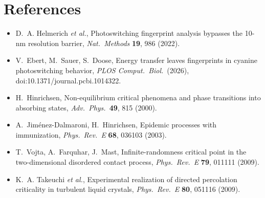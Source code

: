 \documentclass[11pt,a4paper]{article}
\begin{document}
\section*{References}
\begin{itemize}\small
  \item D.~A. Helmerich \emph{et al.}, Photoswitching fingerprint analysis
  bypasses the 10-nm resolution barrier, \emph{Nat.\ Methods} \textbf{19},
  986 (2022).
  \item V.~Ebert, M.~Sauer, S.~Doose, Energy transfer leaves fingerprints in
  cyanine photoswitching behavior, \emph{PLOS Comput.\ Biol.}\ (2026),
  doi:10.1371/journal.pcbi.1014322.
  \item H.~Hinrichsen, Non-equilibrium critical phenomena and phase transitions
  into absorbing states, \emph{Adv.\ Phys.}\ \textbf{49}, 815 (2000).
  \item A.~Jim\'enez-Dalmaroni, H.~Hinrichsen, Epidemic processes with
  immunization, \emph{Phys.\ Rev.\ E} \textbf{68}, 036103 (2003).
  \item T.~Vojta, A.~Farquhar, J.~Mast, Infinite-randomness critical point in
  the two-dimensional disordered contact process, \emph{Phys.\ Rev.\ E}
  \textbf{79}, 011111 (2009).
  \item K.~A. Takeuchi \emph{et al.}, Experimental realization of directed
  percolation criticality in turbulent liquid crystals, \emph{Phys.\ Rev.\ E}
  \textbf{80}, 051116 (2009).
\end{itemize}
\end{document}
